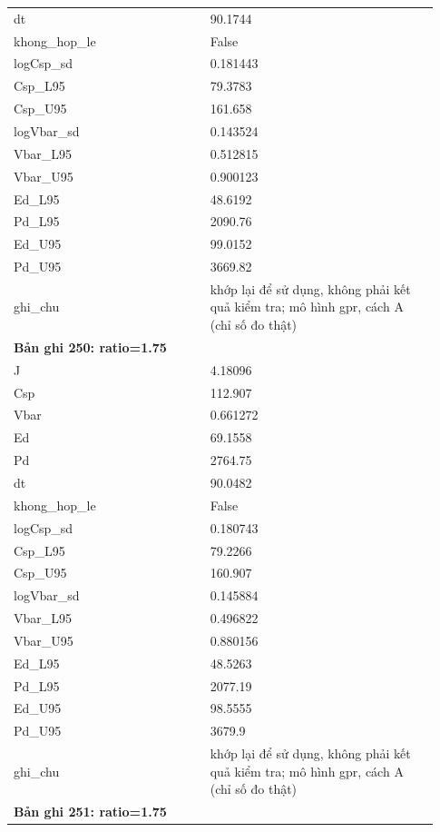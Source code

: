 \begin{longtable}{p{0.43\linewidth}p{0.50\linewidth}}
dt & 90.1744 \\
khong\_\allowbreak hop\_\allowbreak le & False \\
logCsp\_\allowbreak sd & 0.181443 \\
Csp\_\allowbreak L95 & 79.3783 \\
Csp\_\allowbreak U95 & 161.658 \\
logVbar\_\allowbreak sd & 0.143524 \\
Vbar\_\allowbreak L95 & 0.512815 \\
Vbar\_\allowbreak U95 & 0.900123 \\
Ed\_\allowbreak L95 & 48.6192 \\
Pd\_\allowbreak L95 & 2090.76 \\
Ed\_\allowbreak U95 & 99.0152 \\
Pd\_\allowbreak U95 & 3669.82 \\
ghi\_\allowbreak chu & khớp lại để sử dụng, không phải kết quả kiểm tra; mô hình gpr, cách A (chỉ số đo thật) \\
\midrule
\multicolumn{2}{p{0.95\linewidth}}{\textbf{Bản ghi 250: ratio=1.75}} \\
J & 4.18096 \\
Csp & 112.907 \\
Vbar & 0.661272 \\
Ed & 69.1558 \\
Pd & 2764.75 \\
dt & 90.0482 \\
khong\_\allowbreak hop\_\allowbreak le & False \\
logCsp\_\allowbreak sd & 0.180743 \\
Csp\_\allowbreak L95 & 79.2266 \\
Csp\_\allowbreak U95 & 160.907 \\
logVbar\_\allowbreak sd & 0.145884 \\
Vbar\_\allowbreak L95 & 0.496822 \\
Vbar\_\allowbreak U95 & 0.880156 \\
Ed\_\allowbreak L95 & 48.5263 \\
Pd\_\allowbreak L95 & 2077.19 \\
Ed\_\allowbreak U95 & 98.5555 \\
Pd\_\allowbreak U95 & 3679.9 \\
ghi\_\allowbreak chu & khớp lại để sử dụng, không phải kết quả kiểm tra; mô hình gpr, cách A (chỉ số đo thật) \\
\midrule
\multicolumn{2}{p{0.95\linewidth}}{\textbf{Bản ghi 251: ratio=1.75}} \\

\end{longtable}
